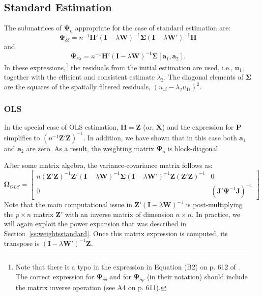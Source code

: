\documentclass{article}
\begin{document}
\subsection{Standard Estimation}\label{ss:asyvarstandard}
The submatrices of $\mathbf{\Psi}_o$ appropriate for the case of standard estimation
are:
\begin{equation}\label{eq:psidd_standard}
\mathbf{\Psi}_{\delta \delta} = n^{-1} \mathbf{H'} (\mathbf{I} - \lambda \mathbf{W} )^{-1} \mathbf{\Sigma}
 (\mathbf{I} - \lambda \mathbf{W'} )^{-1} \mathbf{H}
\end{equation}
and
\begin{equation}\label{eq:psidl_standard}
\mathbf{\Psi}_{\delta \lambda} = n^{-1} \mathbf{H'} (\mathbf{I} - \lambda \mathbf{W} )^{-1} \mathbf{\Sigma} [ \mathbf{a}_1, \mathbf{a}_2 ].
\end{equation}
In these expressions,\footnote{Note that there is a typo in the expression in Equation (B2)
on p. 612 of \cite{Arraizetal:10}. The correct expression for $\mathbf{\Psi}_{\delta \delta}$
and for $\mathbf{\Psi}_{\delta \rho}$ (in their notation) should include the matrix inverse
operation (see A4 on p. 611).}  the residuals from the initial estimation are used, i.e., $\mathbf{u}_1$,
together with the efficient and consistent estimate $\lambda_2$. The diagonal elements
of $\mathbf{\Sigma}$ are the squares of the spatially filtered residuals, $(u_{1i} - \lambda_2 u_{1i} )^{2}$.

\subsubsection{OLS}
In the special case of OLS estimation, $\mathbf{H} = \mathbf{Z}$ (or, $\mathbf{X}$) and the expression
for $\mathbf{P}$ simplifies to $(n^{-1} \mathbf{Z'Z} )^{-1}$. In addition, we have shown that
in this case both $\mathbf{a}_1$ and $\mathbf{a}_2$ are zero. As a result, the weighting
matrix $\mathbf{\Psi}_o$ is block-diagonal

After some matrix algebra, the variance-covariance matrix follows as:
\begin{equation*}
\mathbf{\Omega}_{OLS} =
\left[
\begin{matrix}
n (\mathbf{Z'Z} )^{-1} \mathbf{Z'} ( \mathbf{I} - \lambda \mathbf{W} )^{-1} \mathbf{\Sigma}
 ( \mathbf{I} - \lambda \mathbf{W'} )^{-1} \mathbf{Z} (\mathbf{Z'Z} )^{-1} & 0\\
 0 & ( \mathbf{J'} \mathbf{\Psi}^{-1} \mathbf{J} )^{-1}
 \end{matrix}
\right]
\end{equation*}
Note that the main computational issue in $ \mathbf{Z'} ( \mathbf{I} - \lambda \mathbf{W} )^{-1} $
is post-multiplying the $p \times n$ matrix $\mathbf{Z'}$ with an inverse matrix of dimension
$n \times n$. In practice, we will again exploit the power expansion that was
described in Section~\ref {ss:weightsstandard}.  Once this matrix expression is 
computed, its transpose is  $( \mathbf{I} - \lambda \mathbf{W'} )^{-1} \mathbf{Z}$.
\end{document}
